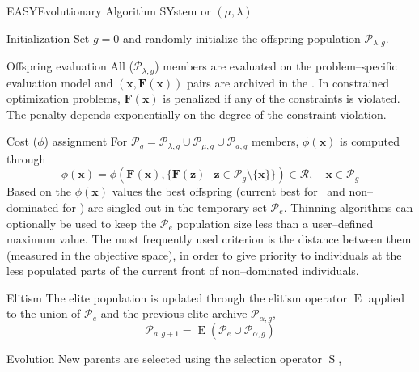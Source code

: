 \documentclass{vki_ls}
\newcommand{\vect}[1]{\bm{#1}}
\newcommand{\set}[1]{\mathcal{#1}}
\newcommand{\op}[1]{\mathop{#1}}
\begin{document}
\begin{namedalgorithm}{EASY}{Evolutionary Algorithm SYstem or $(\mu, \lambda)$ \EA}{}
%
\item[Initialization]\label{a:easyStart}
Set $g\!=\!0$ and randomly initialize the offspring population
$\set{P}_{\lambda,g}$.
%
\item[Offspring evaluation]\label{a:easyEval}
All ($\set{P}_{\lambda,g}$) members are evaluated on the 
problem--specific evaluation model and $(\vect{x},\vect{F}(\vect{x}))$ pairs 
are archived in the \DB. In constrained optimization problems, 
$\vect{F}(\vect{x})$ is penalized if any of the constraints is violated.
The penalty depends exponentially on the degree of the constraint violation.
%
\item[Cost ($\phi$) assignment]\label{a:easyFit}
For $\set{P}_g\!=\!\set{P}_{\lambda,g} \cup \set{P}_{\mu,g} \cup \set{P}_{a,g}$ members, $\phi(\vect{x})$ is computed through
%
\begin{equation}\label{e:costAssign}
     \phi(\vect{x}) = \phi(  \vect{F}(\vect{x}), %
                           \{\vect{F}(\vect{z})\ |\ %
                  \vect{z} \in\set{P}_g\setminus\{\vect{x}\}\}) %
                  \in \set{R}, \quad \vect{x} \in \set{P}_g
\end{equation}
Based on the $\phi(\vect{x})$ values the best offspring (current best for \SOO\ and non--dominated for \MOO) are singled out in the temporary set $\set{P}_e$.
Thinning algorithms can optionally be used to keep the $\set{P}_e$ population size less than a user--defined maximum value. 
The most frequently used criterion is the distance between them (measured in the objective space), in order to give priority to individuals at the less populated parts of the current front of non--dominated individuals.
%
\item[Elitism]\label{a:easyElit}
The elite population is updated through the elitism operator
$\op{E}$ applied to the union of $\set{P}_e$ and the previous elite archive
$\set{P}_{\alpha,g}$,
%
\begin{equation}
	\set{P}_{a,g+1} = \op{E}(\set{P}_{e} \cup \set{P}_{\alpha,g})
	\nonumber
\end{equation}
%
\item[Evolution]
New parents are selected using the selection operator $\op{S}$,

\end{namedalgorithm}
\end{document}
